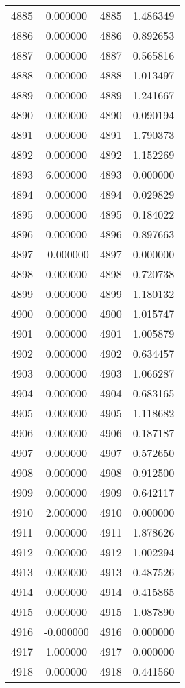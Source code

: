 \documentclass[12pt]{article}
\begin{document}
\begin{longtable}{@{}cccc@{}}
4885 & 0.000000 & 4885 & 1.486349 \\
4886 & 0.000000 & 4886 & 0.892653 \\
4887 & 0.000000 & 4887 & 0.565816 \\
4888 & 0.000000 & 4888 & 1.013497 \\
4889 & 0.000000 & 4889 & 1.241667 \\
4890 & 0.000000 & 4890 & 0.090194 \\
4891 & 0.000000 & 4891 & 1.790373 \\
4892 & 0.000000 & 4892 & 1.152269 \\
4893 & 6.000000 & 4893 & 0.000000 \\
4894 & 0.000000 & 4894 & 0.029829 \\
4895 & 0.000000 & 4895 & 0.184022 \\
4896 & 0.000000 & 4896 & 0.897663 \\
4897 & -0.000000 & 4897 & 0.000000 \\
4898 & 0.000000 & 4898 & 0.720738 \\
4899 & 0.000000 & 4899 & 1.180132 \\
4900 & 0.000000 & 4900 & 1.015747 \\
4901 & 0.000000 & 4901 & 1.005879 \\
4902 & 0.000000 & 4902 & 0.634457 \\
4903 & 0.000000 & 4903 & 1.066287 \\
4904 & 0.000000 & 4904 & 0.683165 \\
4905 & 0.000000 & 4905 & 1.118682 \\
4906 & 0.000000 & 4906 & 0.187187 \\
4907 & 0.000000 & 4907 & 0.572650 \\
4908 & 0.000000 & 4908 & 0.912500 \\
4909 & 0.000000 & 4909 & 0.642117 \\
4910 & 2.000000 & 4910 & 0.000000 \\
4911 & 0.000000 & 4911 & 1.878626 \\
4912 & 0.000000 & 4912 & 1.002294 \\
4913 & 0.000000 & 4913 & 0.487526 \\
4914 & 0.000000 & 4914 & 0.415865 \\
4915 & 0.000000 & 4915 & 1.087890 \\
4916 & -0.000000 & 4916 & 0.000000 \\
4917 & 1.000000 & 4917 & 0.000000 \\
4918 & 0.000000 & 4918 & 0.441560 \\

\end{longtable}
\end{document}
